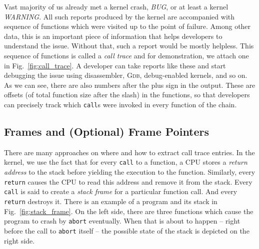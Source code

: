 \documentclass[10pt]{llncs}
\newcommand{\code}[2][]{\lstinline[columns=fullflexible, #1]$#2$}
\newcommand{\codeasm}[2][]{\code[language={[x86masm]Assembler},
	morekeywords={rbp,rsp},#1]{#2}}
\begin{document}
Vast majority of us already met a kernel crash, \textit{BUG}, or at least a
kernel \textit{WARNING}. All such reports produced by the kernel are
accompanied with sequence of functions which were visited up to the point
of failure. Among other data, this is an important piece of information that
helps developers to understand the issue. Without that, such a report would be
mostly helpless. This sequence of functions is called a \emph{call trace} and
for demonstration, we attach one in Fig.~\ref{fig:call_trace}.  A developer
can take reports like these and start debugging the issue using disassembler,
\textsc{Gdb}, debug-enabled kernels, and so on. As we can see, there are also
numbers after the plus sign in the output. These are offsets (of total
function size after the slash) in the functions, so that developers can
precisely track which \codeasm{call}s were invoked in every function of the
chain.

\subsection{Frames and (Optional) Frame Pointers} \label{sec:fp}
There are many approaches on where and how to extract call trace entries.
In the kernel, we use the fact that for every \codeasm{call} to a function, a
CPU stores a \emph{return address} to the stack before yielding the execution
to the function. Similarly, every \code{return} causes the CPU to read this
address and remove it from the stack. Every \codeasm{call} is said to create a
\emph{stack frame} for a particular function call. And every \code{return}
destroys it.  There is an example of a program and its stack in
Fig.~\ref{fig:stack_frame}. On the left side, there are three functions which
cause the program to crash by \code{abort} eventually.  When that is about to
happen -- right before the call to \code{abort} itself -- the possible state
of the stack is depicted on the right side.
\end{document}
